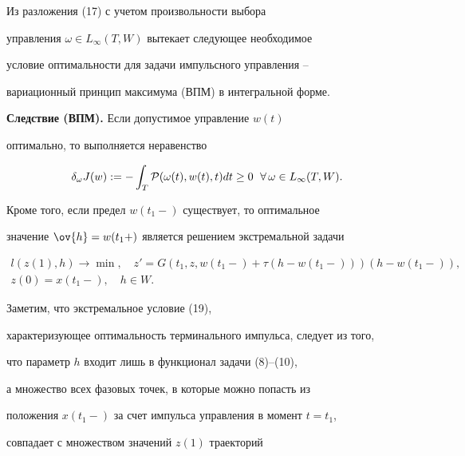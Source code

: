 Из разложения (17) с учетом произвольности выбора


управления $\omega\in L_\infty(T,W)$ вытекает следующее необходимое


условие оптимальности для задачи импульсного управления --


вариационный принцип максимума (ВПМ) в интегральной форме.


\medskip





{\bf Следствие (ВПМ).} Если допустимое управление $w(t)$


оптимально, то выполняется неравенство


\begin{equation}


\delta_\omega J(w):=-\int_T{\cal P}(\omega(t),w(t),t)dt \ge 0 


\ \; \forall\, \omega\in L_\infty(T,W).


\end{equation}


Кроме того, если предел $w(t_1-)$ существует, то оптимальное


значение $\ov{h} =w(t_1+)$ является решением экстремальной задачи


\begin{equation}


\begin{array}{c}


l(z(1),h) \to \min, \quad


z'=G(t_1,z,w(t_1-)+\tau(h-w(t_1-)))(h-w(t_1-)), \\[2mm]


z(0)=x(t_1-), \quad h\in W.


\end{array}


\end{equation}





Заметим, что экстремальное условие (19), 


характеризующее оптимальность терминального импульса, следует из того,


что параметр $h$ входит лишь в функционал задачи (8)--(10),


а множество всех фазовых точек, в которые можно попасть из


положения $x(t_1-)$ за счет импульса управления в момент $t=t_1$,


совпадает с множеством значений $z(1)$ траекторий


